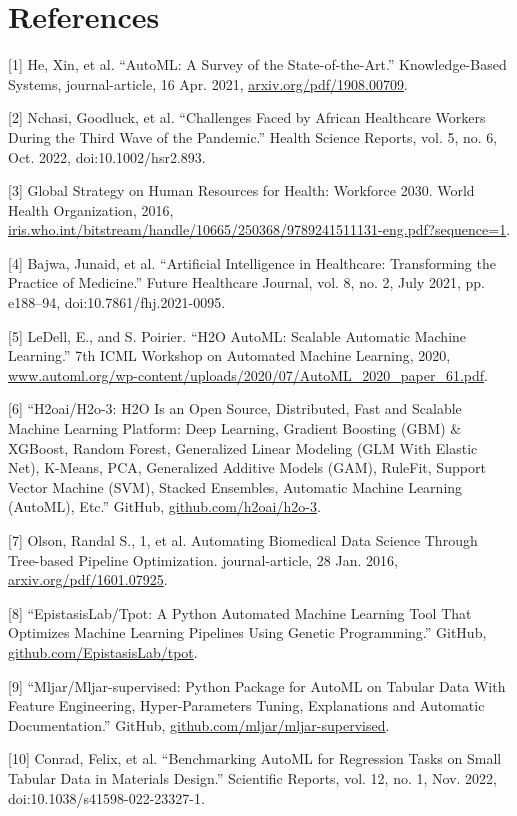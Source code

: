 \documentclass{article}
\begin{document}
\section*{References}
\medskip
{
\small

[1] He, Xin, et al. “AutoML: A Survey of the State-of-the-Art.” Knowledge-Based Systems, journal-article, 16 Apr. 2021, \url{arxiv.org/pdf/1908.00709}.

[2] Nchasi, Goodluck, et al. “Challenges Faced by African Healthcare Workers During the Third Wave of the Pandemic.” Health Science Reports, vol. 5, no. 6, Oct. 2022, doi:10.1002/hsr2.893.

[3] Global Strategy on Human Resources for Health: Workforce 2030. World Health Organization, 2016, \url{iris.who.int/bitstream/handle/10665/250368/9789241511131-eng.pdf?sequence=1}.

[4] Bajwa, Junaid, et al. “Artificial Intelligence in Healthcare: Transforming the Practice of Medicine.” Future Healthcare Journal, vol. 8, no. 2, July 2021, pp. e188–94, doi:10.7861/fhj.2021-0095.

[5] LeDell, E., and S. Poirier. “H2O AutoML: Scalable Automatic Machine Learning.” 7th ICML Workshop on Automated Machine Learning, 2020, \url{www.automl.org/wp-content/uploads/2020/07/AutoML_2020_paper_61.pdf}.

[6] “H2oai/H2o-3: H2O Is an Open Source, Distributed, Fast and Scalable Machine Learning Platform: Deep Learning, Gradient Boosting (GBM) \& XGBoost, Random Forest, Generalized Linear Modeling (GLM With Elastic Net), K-Means, PCA, Generalized Additive Models (GAM), RuleFit, Support Vector Machine (SVM), Stacked Ensembles, Automatic Machine Learning (AutoML), Etc.” GitHub, \url{github.com/h2oai/h2o-3}.

[7] Olson, Randal S., 1, et al. Automating Biomedical Data Science Through Tree-based Pipeline Optimization. journal-article, 28 Jan. 2016, \url{arxiv.org/pdf/1601.07925}.

[8] “EpistasisLab/Tpot: A Python Automated Machine Learning Tool That Optimizes Machine Learning Pipelines Using Genetic Programming.” GitHub, \url{github.com/EpistasisLab/tpot}.

[9] “Mljar/Mljar-supervised: Python Package for AutoML on Tabular Data With Feature Engineering, Hyper-Parameters Tuning, Explanations and Automatic Documentation.” GitHub, \url{github.com/mljar/mljar-supervised}.

[10] Conrad, Felix, et al. “Benchmarking AutoML for Regression Tasks on Small Tabular Data in Materials Design.” Scientific Reports, vol. 12, no. 1, Nov. 2022, doi:10.1038/s41598-022-23327-1.

}
\end{document}

